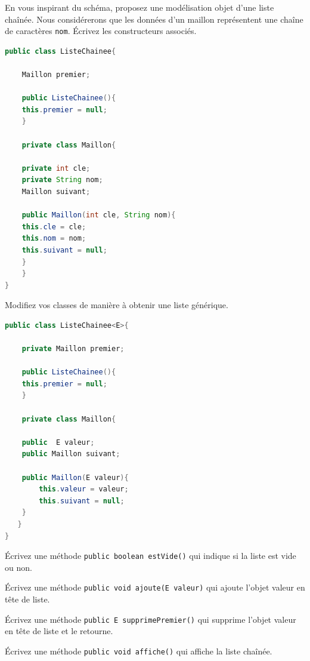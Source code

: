\documentclass[iutinfo,a4paper,nocorrections,10pt]{ustl-tdtp}
\begin{document}
\question En vous inspirant du schéma, proposez une modélisation objet d'une liste chaînée. Nous considérerons que les données d'un maillon représentent une chaîne de caractères \texttt{nom}. Écrivez les constructeurs associés.


\begin{correction}
{\color{red}
\begin{lstlisting}[language=Java]
public class ListeChainee{

    Maillon premier;
    
    public ListeChainee(){
	this.premier = null;
    } 
    
    private class Maillon{
	
	private int cle;
	private String nom;
	Maillon suivant;
	
	public Maillon(int cle, String nom){
	this.cle = cle;
	this.nom = nom;
	this.suivant = null;	
	} 
    }
}
\end{lstlisting}
}

\end{correction}




\question Modifiez vos classes de manière à obtenir une liste générique.


\begin{correction}
{\color{red}
\begin{lstlisting}[language=Java]
public class ListeChainee<E>{
 
    private Maillon premier;
    
    public ListeChainee(){
	this.premier = null;
    } 

    private class Maillon{
	
	public  E valeur;
	public Maillon suivant;
	
	public Maillon(E valeur){
	    this.valeur = valeur;
	    this.suivant = null;	
	} 
   }
}
\end{lstlisting}
}

\end{correction}

\question Écrivez une méthode \texttt{public boolean estVide()} qui indique si la liste est vide ou non.

\question Écrivez une méthode \texttt{public void ajoute(E valeur)} qui ajoute l'objet valeur en tête de liste.

\question Écrivez une méthode \texttt{public E supprimePremier()} qui supprime l'objet valeur en tête de liste et le retourne. 

\question Écrivez une méthode \texttt{public void affiche()} qui affiche la liste chaînée.
\end{document}
